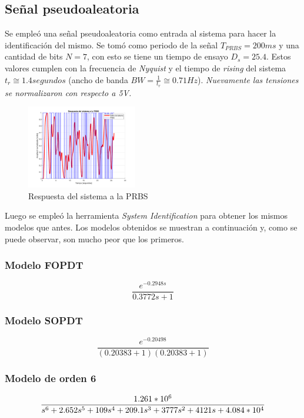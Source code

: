 \documentclass[letterpaper, 10 pt, conference]{ieeeconf}  %
\begin{document}
\subsection{Señal pseudoaleatoria}

Se empleó una señal pseudoaleatoria como entrada al sistema para hacer la identificación del mismo. Se tomó como periodo de la señal $T_{PRBS} = 200ms$ y una cantidad de bits $N=7$, con esto se tiene un tiempo de ensayo $D_s = 25.4$. Estos valores cumplen con la frecuencia de \textit{Nyquist} y el tiempo de \textit{rising} del sistema $t_{r} \cong 1.4segundos$ (ancho de banda $BW = \frac{1}{t_{r}} \cong 0.71Hz$).
\textit{Nuevamente las tensiones se normalizaron con respecto a 5V.}

\begin{figure}[H]
  \centering
  \includegraphics[width=0.43\textwidth]{./IMAGENES/datos_prbs.png}
  \caption{Respuesta del sistema a la PRBS}
  \label{fig:datos_prbs}
\end{figure}

Luego se empleó la herramienta \textit{System Identification} para obtener los mismos modelos que antes. Los modelos obtenidos se muestran a continuación y, como se puede observar, son mucho peor que los primeros.

\subsubsection{Modelo FOPDT}
\begin{equation}
  \frac{e^{-0.2948s}}{0.3772s+1}
\end{equation}

\subsubsection{Modelo SOPDT}
\begin{equation}
  \frac{e^{-0.20498}}{(0.20383+1)(0.20383+1)}
\end{equation}

\subsubsection{Modelo de orden 6}
\begin{equation}
  \tiny{\frac{1.261*10^6}{s^6 + 2.652 s^5 + 109 s^4 + 209.1 s^3 + 3777 s^2 + 4121 s + 4.084*10^{4}}}
\end{equation}
\end{document}
